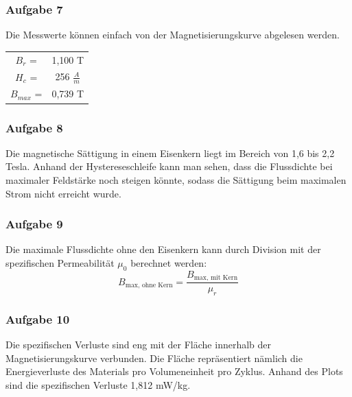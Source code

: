 \documentclass[a4paper,twoside,12pt,DIV=13,BCOR=5mm,numbers=noenddot,cleardoublepage=empty]{scrbook}
\begin{document}
            \subsubsection{Aufgabe 7} Die Messwerte können einfach von der Magnetisierungskurve abgelesen werden. \\
            \begin{tabular}{c c}
                $B_r$ =& 1,100 T  \\
                $H_c$ =& 256 $\frac{A}{m}$ \\
                $B_{max}$ =& 0,739 T
            \end{tabular}
            
            
            
            \subsubsection{Aufgabe 8} Die magnetische Sättigung in einem Eisenkern liegt im Bereich von 1,6 bis 2,2 Tesla. Anhand der Hystereseschleife kann man sehen, dass die Flussdichte bei maximaler Feldstärke noch steigen könnte, sodass die Sättigung beim maximalen Strom nicht erreicht wurde.

            
            
            \subsubsection{Aufgabe 9} Die maximale Flussdichte ohne den Eisenkern kann durch Division mit der spezifischen Permeabilität $\mu_0$ berechnet werden:
                \begin{equation}
                B_{\text{max, ohne Kern}} = \frac{B_{\text{max, mit Kern}}}{\mu_r}
                \end{equation}
    
            
            
            \subsubsection{Aufgabe 10} Die spezifischen Verluste sind eng mit der Fläche innerhalb der Magnetisierungskurve verbunden. Die Fläche repräsentiert nämlich die Energieverluste des Materials pro Volumeneinheit pro Zyklus. Anhand des Plots sind die spezifischen Verluste 1,812 mW/kg.
        
    

	\newpage
\end{document}
